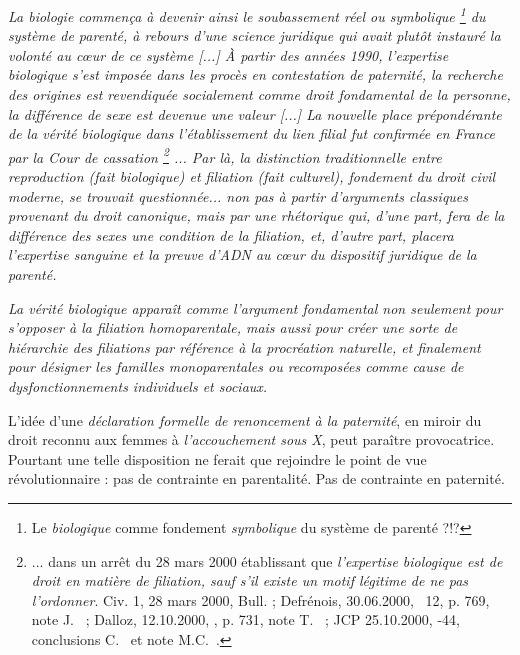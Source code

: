 \begin{displayquote}

{\emph{La biologie commença à devenir ainsi le soubassement réel ou symbolique%
\footnote{Le \emph{biologique} comme fondement \emph{symbolique} du système de parenté ?!?} 
du système de parenté, à rebours d'une science juridique qui avait plutôt instauré la volonté au cœur de ce système \emph{[...]} À partir des années 1990, l'expertise biologique s'est imposée dans les procès en contestation de paternité, la recherche des origines est revendiquée socialement comme droit fondamental de la personne, la différence de sexe est devenue une valeur \emph{[...]} La nouvelle place prépondérante de la vérité biologique dans l'établissement du lien filial fut confirmée en France par la Cour de cassation%
\footnote{... dans un arrêt du 28 mars 2000 établissant que {\emph{l'expertise biologique est de droit en matière de filiation, sauf s'il existe un motif légitime de ne pas l'ordonner}}. Civ. 1\iere, 28 mars 2000, Bull.  ; \hbox{Defrénois}, \hbox{30.06.2000}, \no~12, p. 769, note J.~ ; \hbox{Dalloz}, \hbox{12.10.2000}, , p. 731, note T.~ ; JCP \hbox{25.10.2000}, -44, conclusions C.~ et note M.C.~.}%
... Par là, la distinction traditionnelle entre reproduction (fait biologique) et filiation (fait culturel), fondement du droit civil moderne, se trouvait questionnée... non pas à partir d'arguments classiques provenant du droit canonique, mais par une rhétorique qui, d'une part, fera de la différence des sexes une condition  de la filiation, et, d'autre part, placera l'expertise sanguine et la preuve d'ADN au cœur du dispositif juridique de la parenté.}}
 
 {\emph{La vérité biologique apparaît comme l'argument fondamental non seulement pour s'opposer à la filiation homoparentale, mais aussi pour créer une sorte de hiérarchie des filiations par référence à la procréation naturelle, et finalement pour désigner les familles monoparentales ou recomposées comme cause de dysfonctionnements individuels et sociaux.}}
 
\end{displayquote} 
 
 L'idée d'une {\emph{déclaration formelle de renoncement à la paternité}}, en miroir du droit reconnu aux femmes à \emph{l'accouchement sous X}, peut paraître provocatrice. Pourtant une telle disposition ne ferait que rejoindre le point de vue révolutionnaire : pas de contrainte en parentalité. Pas de contrainte en paternité.
 
